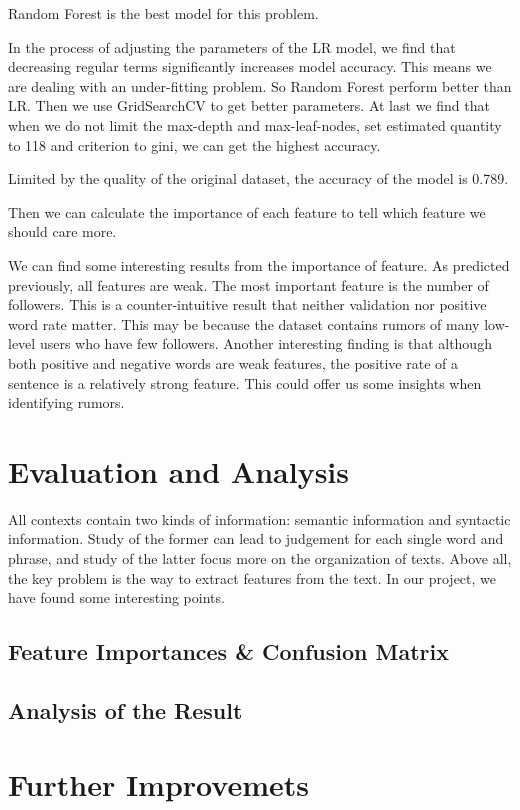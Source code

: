 \documentclass[12pt,a4paper]{article}
\begin{document}
Random Forest is the best model for this problem.

In the process of adjusting the parameters of the LR model, we find that decreasing regular terms significantly increases model accuracy. This means we are dealing with an under-fitting problem. So Random Forest perform better than LR. Then we use GridSearchCV to get better parameters. At last we find that when we do not limit the max-depth and max-leaf-nodes, set estimated quantity to 118 and criterion to gini, we can get the highest accuracy. 

Limited by the quality of the original dataset, the accuracy of the model is 0.789.

Then we can calculate the importance of each feature to tell which feature we should care more.

We can find some interesting results from the importance of feature. As predicted previously, all features are weak. The most important feature is the number of followers. This is a counter-intuitive result that neither validation nor positive word rate matter. This may be because the dataset contains rumors of many low-level users who have few followers. Another interesting finding is that although both positive and negative words are weak features, the positive rate of a sentence is a relatively strong feature. This could offer us some insights when identifying rumors.

\section{Evaluation and Analysis}
All contexts contain two kinds of information: semantic information and syntactic information. Study of the former can lead to judgement for each single word and phrase, and study of the latter focus more on the organization of texts. Above all, the key problem is the way to extract features from the text. In our project, we have found some interesting points.
\subsection{Feature Importances \& Confusion Matrix}


\subsection{Analysis of the Result}

\section{Further Improvemets}
\end{document}
